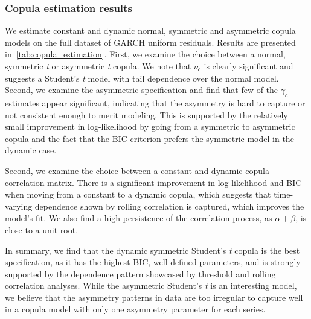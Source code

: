 \subsubsection{Copula estimation results}

We estimate constant and dynamic normal, symmetric and asymmetric copula models on the full dataset of GARCH uniform residuals. Results are presented in~\autoref{tab:copula_estimation}. First, we examine the choice between a normal, symmetric \textit{t} or asymmetric \textit{t} copula. We note that $\nu_c$ is clearly significant and suggests a Student's \textit{t} model with tail dependence over the normal model. Second, we examine the asymmetric specification and find that few of the $\gamma_c$ estimates appear significant, indicating that the asymmetry is hard to capture or not consistent enough to merit modeling. This is supported by the relatively small improvement in log-likelihood by going from a symmetric to asymmetric copula and the fact that the BIC criterion prefers the symmetric model in the dynamic case. 

Second, we examine the choice between a constant and dynamic copula correlation matrix. There is a significant improvement in log-likelihood and BIC when moving from a constant to a dynamic copula, which suggests that time-varying dependence shown by rolling correlation is captured, which improves the model's fit. We also find a high persistence of the correlation process, as $\alpha + \beta$, is close to a unit root.

In summary, we find that the dynamic symmetric Student's \textit{t} copula is the best specification, as it has the highest BIC, well defined parameters, and is strongly supported by the dependence pattern showcased by threshold and rolling correlation analyses. While the asymmetric Student's \textit{t} is an interesting model, we believe that the asymmetry patterns in data are too irregular to capture well in a copula model with only one asymmetry parameter for each series.